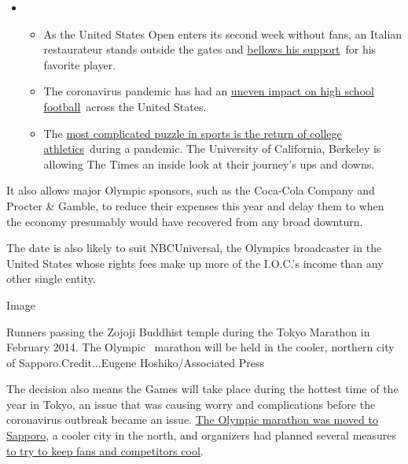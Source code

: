 \begin{itemize}
\item
  \begin{itemize}
  \tightlist
  \item
    As the United States Open enters its second week without fans, an
    Italian restaurateur stands outside the gates and
    \href{https://www.nytimes3xbfgragh.onion/2020/09/06/sports/tennis/US-Open-Matteo-Berrettini-fan.html?action=click\&pgtype=Article\&state=default\&region=MAIN_CONTENT_2\&context=storylines_keepup}{bellows
    his support}~for his favorite player.
  \item
    The coronavirus pandemic has had an
    \href{https://www.nytimes3xbfgragh.onion/2020/09/03/sports/ncaafootball/high-school-football-coronavirus-pandemic.html?action=click\&pgtype=Article\&state=default\&region=MAIN_CONTENT_2\&context=storylines_keepup}{uneven
    impact on high school football}~across the United States.
  \item
    The
    \href{https://www.nytimes3xbfgragh.onion/2020/09/02/sports/ncaafootball/coronavirus-cal-athletics-season.html?action=click\&pgtype=Article\&state=default\&region=MAIN_CONTENT_2\&context=storylines_keepup}{most
    complicated puzzle in sports is the return of college
    athletics}~during a pandemic. The University of California, Berkeley
    is allowing The Times an inside look at their journey's ups and
    downs.
  \end{itemize}
\end{itemize}

It also allows major Olympic sponsors, such as the Coca-Cola Company and
Procter \& Gamble, to reduce their expenses this year and delay them to
when the economy presumably would have recovered from any broad
downturn.

The date is also likely to suit NBCUniversal, the Olympics broadcaster
in the United States whose rights fees make up more of the I.O.C.'s
income than any other single entity.

Image

Runners passing the Zojoji Buddhist temple during the Tokyo Marathon in
February 2014. The Olympic~ marathon will be held in the cooler,
northern city of Sapporo.Credit...Eugene Hoshiko/Associated Press

The decision also means the Games will take place during the hottest
time of the year in Tokyo, an issue that was causing worry and
complications before the coronavirus outbreak became an issue.
\href{https://www.nytimes3xbfgragh.onion/2019/10/16/sports/olympic-marathon-tokyo-heat.html}{The
Olympic marathon was moved to Sapporo}, a cooler city in the north, and
organizers had planned several measures
\href{https://www.nytimes3xbfgragh.onion/2019/10/10/sports/tokyo-braces-for-the-hottest-olympics-ever.html}{to
try to keep fans and competitors cool}.

